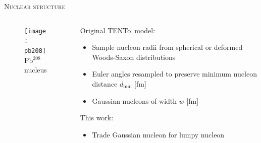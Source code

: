 \documentclass[aspectratio=169]{beamer}
\newcommand{\trento}{T\raisebox{-0.3ex}{R}ENTo}
\begin{document}
\begin{frame}[t]{\scshape Nuclear structure}
  \begin{columns}[T]
    \begin{column}{.4\textwidth}
      \begin{figure}
        \texttt{[image: pb208]}\\
        Pb$^{208}$ nucleus
      \end{figure}
    \end{column}
    \begin{column}{.6\textwidth}
      \bigskip
      \textcolor{theme}{Original \trento\ model:}
      \begin{itemize}
        \item Sample nucleon radii from spherical or deformed Woods-Saxon distributions
        \item Euler angles resampled to preserve minimum nucleon distance
          $d_\mathrm{min}$ [fm]
        \item Gaussian nucleons of width $w$ [fm]
      \end{itemize}
      \medskip
      \textcolor{theme}{This work:}
      \begin{itemize}
        \item Trade Gaussian nucleon for lumpy nucleon
      \end{itemize}
    \end{column}
  \end{columns}
\end{frame}
\end{document}
